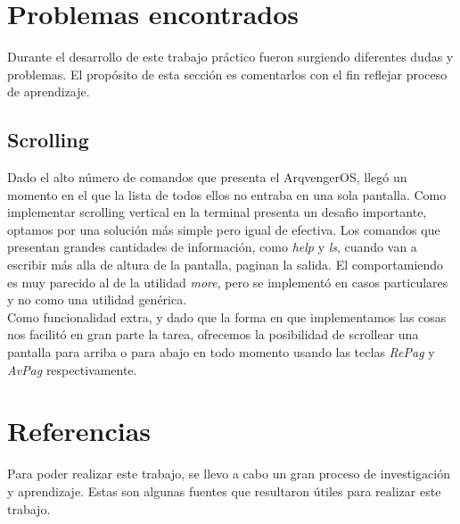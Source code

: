 \documentclass[a4paper,10pt]{article}
\begin{document}
\newpage
\section{Problemas encontrados}

Durante el desarrollo de este trabajo práctico fueron surgiendo diferentes dudas y problemas. El propósito de esta
sección es comentarlos con el fin reflejar proceso de aprendizaje.

        \subsection{Scrolling}
        Dado el alto número de comandos que presenta el ArqvengerOS, llegó un momento en el que la lista de todos ellos no entraba en una sola pantalla.
        Como implementar scrolling vertical en la terminal presenta un desafio importante, optamos por una solución más simple pero igual de efectiva.
        Los comandos que presentan grandes cantidades de información, como \textit{help} y \textit{ls}, cuando van a escribir más alla de altura de la pantalla, 
        paginan la salida.
        El comportamiendo es muy parecido al de la utilidad \textit{more}, pero se implementó en casos particulares y no como una utilidad genérica. \\


        Como funcionalidad extra, y dado que la forma en que implementamos las cosas nos facilitó en gran parte la tarea, ofrecemos la posibilidad de scrollear una 
        pantalla para arriba o para abajo en todo momento usando las teclas \textit{RePag} y \textit{AvPag} respectivamente.


\newpage     
\section{Referencias}

Para poder realizar este trabajo, se llevo a cabo un gran proceso de investigación y aprendizaje. Estas son algunas fuentes que resultaron útiles para realizar 
este trabajo.\\
\end{document}
